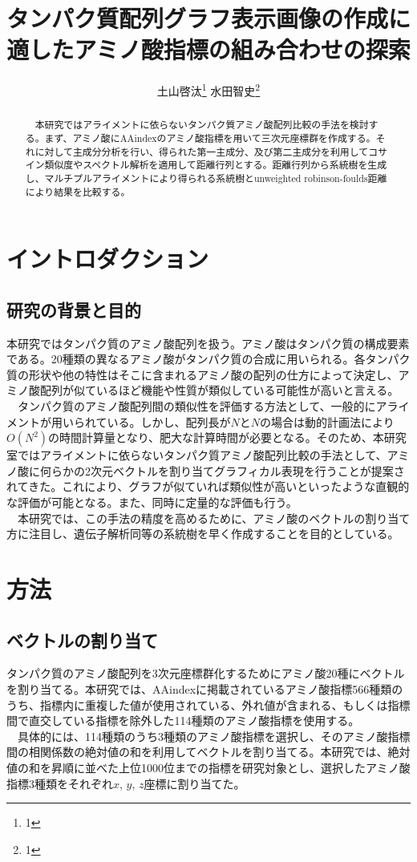 \documentclass[twocolumn,paper=a4paper,landscape,fontsize=9pt]{jlreq}
\title{タンパク質配列グラフ表示画像の作成に適したアミノ酸指標の組み合わせの探索}
\author{土山啓汰\thanks{1} 水田智史\thanks{1}}
\begin{document}

\maketitle

\begin{abstract}
　本研究ではアライメントに依らないタンパク質アミノ酸配列比較の手法を検討する。まず、アミノ酸にAAindexのアミノ酸指標を用いて三次元座標群を作成する。それに対して主成分分析を行い、得られた第一主成分、及び第二主成分を利用してコサイン類似度やスペクトル解析を適用して距離行列とする。距離行列から系統樹を生成し、マルチプルアライメントにより得られる系統樹とunweighted robinson-foulds距離により結果を比較する。
\end{abstract}

\section{イントロダクション}
\subsection{研究の背景と目的}
本研究ではタンパク質のアミノ酸配列を扱う。アミノ酸はタンパク質の構成要素である。20種類の異なるアミノ酸がタンパク質の合成に用いられる。各タンパク質の形状や他の特性はそこに含まれるアミノ酸の配列の仕方によって決定し、アミノ酸配列が似ているほど機能や性質が類似している可能性が高いと言える。 \\
　タンパク質のアミノ酸配列間の類似性を評価する方法として、一般的にアライメントが用いられている。しかし、配列長が$N$と$N$の場合は動的計画法により$O(N^2)$の時間計算量となり、肥大な計算時間が必要となる。そのため、本研究室ではアライメントに依らないタンパク質アミノ酸配列比較の手法として、アミノ酸に何らかの2次元ベクトルを割り当てグラフィカル表現を行うことが提案されてきた。これにより、グラフが似ていれば類似性が高いといったような直観的な評価が可能となる。また、同時に定量的な評価も行う。\\
　本研究では、この手法の精度を高めるために、アミノ酸のベクトルの割り当て方に注目し、遺伝子解析同等の系統樹を早く作成することを目的としている。


\section{方法}
\subsection{ベクトルの割り当て}
タンパク質のアミノ酸配列を3次元座標群化するためにアミノ酸20種にベクトルを割り当てる。本研究では、AAindexに掲載されているアミノ酸指標566種類のうち、指標内に重複した値が使用されている、外れ値が含まれる、もしくは指標間で直交している指標を除外した114種類のアミノ酸指標を使用する。\\
　具体的には、114種類のうち3種類のアミノ酸指標を選択し、そのアミノ酸指標間の相関係数の絶対値の和を利用してベクトルを割り当てる。本研究では、絶対値の和を昇順に並べた上位1000位までの指標を研究対象とし、選択したアミノ酸指標3種類をそれぞれ$x$, $y$, $z$座標に割り当てた。
\end{document}
